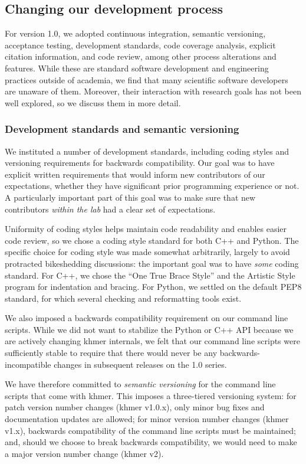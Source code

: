\documentclass[12pt]{article}
\begin{document}
\subsection{Changing our development process}

For version 1.0, we adopted continuous integration, semantic
versioning, acceptance testing, development standards, code coverage
analysis, explicit citation information, and code review, among other
process alterations and features.  While these are standard software
development and engineering practices outside of academia, we find
that many scientific software developers are unaware of them.
Moreover, their interaction with research goals has not been well
explored, so we discuss them in more detail.

\subsubsection{Development standards and semantic versioning}

We instituted a number of development standards, including coding
styles and versioning requirements for backwards compatibility.  Our
goal was to have explicit written requirements that would inform new
contributors of our expectations, whether they have significant prior
programming experience or not.  A particularly important part of this
goal was to make sure that new contributors {\em within the lab} had
a clear set of expectations.

Uniformity of coding styles helps maintain code readability and
enables easier code review, so we chose a coding style standard for
both C++ and Python. The specific choice for coding style was made
somewhat arbitrarily, largely to avoid protracted bikeshedding
discussions: the important goal was to have {\em some} coding
standard. For C++, we chose the ``One True Brace Style'' and the
Artistic Style program for indentation and bracing.  For Python, we
settled on the default PEP8 standard, for which several checking and
reformatting tools exist.

We also imposed a backwards compatibility requirement on our command
line scripts.  While we did not want to stabilize the Python or C++
API because we are actively changing khmer internals, we felt that our
command line scripts were sufficiently stable to require that there would never
be any backwards-incompatible changes in subsequent releases on the 1.0 series.

We have therefore committed to {\em semantic versioning} \cite{semver} for the
command line scripts that come with khmer.  This imposes a
three-tiered versioning system: for patch version number changes
(khmer v1.0.x), only minor bug fixes and documentation updates are
allowed; for minor version number changes (khmer v1.x), backwards
compatibility of the command line scripts must be maintained; and,
should we choose to break backwards compatibility, we would need to
make a major version number change (khmer v2).
\end{document}
